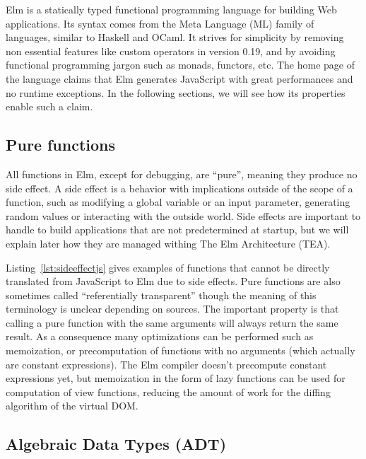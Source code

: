 Elm is a statically typed functional programming language for building Web applications.
Its syntax comes from the Meta Language (ML) family of languages, similar to Haskell and OCaml.
It strives for simplicity by removing non essential features
like custom operators in version 0.19,
and by avoiding functional programming jargon such as monads, functors, etc.
The home page of the language claims that Elm generates JavaScript
with great performances and no runtime exceptions.
In the following sections, we will see how its properties enable such a claim.

\subsection{Pure functions}%
\label{sub:pure_functions}

All functions in Elm, except for debugging, are ``pure'',
meaning they produce no side effect.
A side effect is a behavior with implications outside of the scope of a function,
such as modifying a global variable or an input parameter,
generating random values or interacting with the outside world.
Side effects are important to handle to build applications that are not predetermined
at startup, but we will explain later how they are managed withing The Elm Architecture (TEA).

Listing~\ref{lst:sideeffectjs} gives examples of functions that cannot be directly
translated from JavaScript to Elm due to side effects.
Pure functions are also sometimes called ``referentially transparent''
though the meaning of this terminology is unclear depending on sources.
The important property is that calling a pure function with the same arguments
will always return the same result.
As a consequence many optimizations can be performed such as memoization,
or precomputation of functions with no arguments (which actually are constant expressions).
The Elm compiler doesn't precompute constant expressions yet,
but memoization in the form of lazy functions can be used for computation
of view functions, reducing the amount of work for the diffing algorithm
of the virtual DOM.\@




\subsection{Algebraic Data Types (ADT)}%
\label{sub:algebraic_data_types_adt_}

